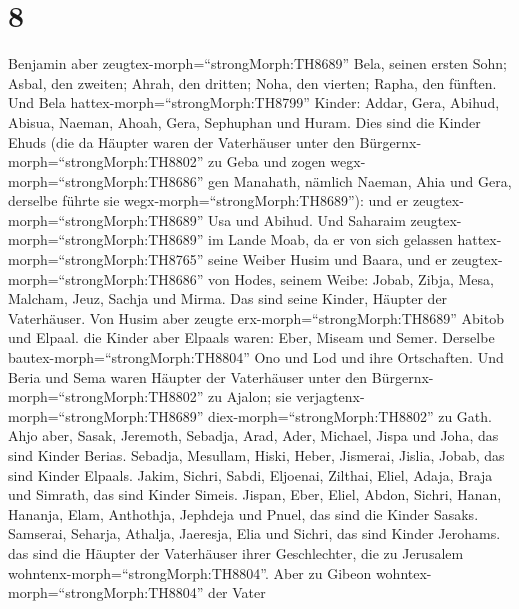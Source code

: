 \hypertarget{section-7}{%
\section{8}\label{section-7}}

 Benjamin aber zeugtex-morph=``strongMorph:TH8689'' Bela,
seinen ersten Sohn; Asbal, den zweiten; Ahrah, den dritten; 
Noha, den vierten; Rapha, den fünften.  Und Bela
hattex-morph=``strongMorph:TH8799'' Kinder: Addar, Gera, Abihud,
 Abisua, Naeman, Ahoah,  Gera, Sephuphan und
Huram.  Dies sind die Kinder Ehuds (die da Häupter waren der
Vaterhäuser unter den Bürgernx-morph=``strongMorph:TH8802'' zu Geba und
zogen wegx-morph=``strongMorph:TH8686'' gen Manahath, 
nämlich Naeman, Ahia und Gera, derselbe führte sie
wegx-morph=``strongMorph:TH8689''): und er
zeugtex-morph=``strongMorph:TH8689'' Usa und Abihud.  Und
Saharaim zeugtex-morph=``strongMorph:TH8689'' im Lande Moab, da er von
sich gelassen hattex-morph=``strongMorph:TH8765'' seine Weiber Husim und
Baara,  und er zeugtex-morph=``strongMorph:TH8686'' von
Hodes, seinem Weibe: Jobab, Zibja, Mesa, Malcham,  Jeuz,
Sachja und Mirma. Das sind seine Kinder, Häupter der Vaterhäuser.
 Von Husim aber zeugte erx-morph=``strongMorph:TH8689''
Abitob und Elpaal.  die Kinder aber Elpaals waren: Eber,
Miseam und Semer. Derselbe bautex-morph=``strongMorph:TH8804'' Ono und
Lod und ihre Ortschaften.  Und Beria und Sema waren Häupter
der Vaterhäuser unter den Bürgernx-morph=``strongMorph:TH8802'' zu
Ajalon; sie verjagtenx-morph=``strongMorph:TH8689''
diex-morph=``strongMorph:TH8802'' zu Gath.  Ahjo aber,
Sasak, Jeremoth,  Sebadja, Arad, Ader, 
Michael, Jispa und Joha, das sind Kinder Berias.  Sebadja,
Mesullam, Hiski, Heber,  Jismerai, Jislia, Jobab, das sind
Kinder Elpaals.  Jakim, Sichri, Sabdi, 
Eljoenai, Zilthai, Eliel,  Adaja, Braja und Simrath, das
sind Kinder Simeis.  Jispan, Eber, Eliel, 
Abdon, Sichri, Hanan,  Hananja, Elam, Anthothja,
 Jephdeja und Pnuel, das sind die Kinder Sasaks.
 Samserai, Seharja, Athalja,  Jaeresja, Elia
und Sichri, das sind Kinder Jerohams.  das sind die Häupter
der Vaterhäuser ihrer Geschlechter, die zu Jerusalem
wohntenx-morph=``strongMorph:TH8804''.  Aber zu Gibeon
wohntex-morph=``strongMorph:TH8804'' der Vater
